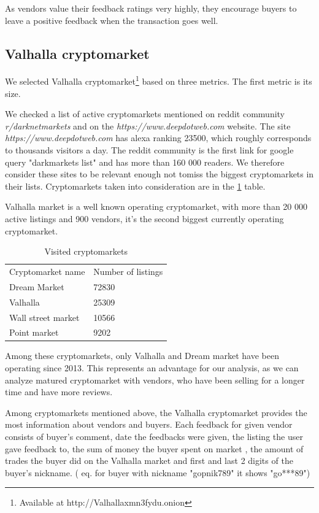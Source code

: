 \documentclass[
  digital, %
  table,   %
  lof,     %
  lot,     %
  oneside
]{fithesis3}
\begin{document}
As vendors value their feedback ratings very highly, they encourage buyers to leave a positive feedback when the transaction goes well.
 
\subsection{Valhalla cryptomarket}

We selected Valhalla cryptomarket\footnote{Available at http://Valhallaxmn3fydu.onion} based on three metrics.
The first metric is its size.

We checked a list of active cryptomarkets mentioned on reddit community \emph{r/darknetmarkets} and on the 
\emph{https://www.deepdotweb.com} website.
The site \emph{https://www.deepdotweb.com} has alexa ranking 23500, which roughly corresponds to thousands visitors a day.
The reddit community is the first link for google query "darkmarkets list" and 
has more than 160 000 readers. We therefore consider these sites to be relevant enough not tomiss
the biggest cryptomarkets in their lists. Cryptomarkets taken into consideration are in the \ref{cryptomarkets} table.

Valhalla market is a well known operating cryptomarket, with more than 20 000 active listings and 900 vendors, it's the second biggest currently operating cryptomarket.

\begin{table}
    \caption{Visited cryptomarkets}
    \label{cryptomarkets}
    \begin{tabular}{|l|l|}
    Cryptomarket name & Number of listings\\
    Dream Market & 72830 \\
    Valhalla     & 25309 \\
    Wall street market   & 10566 \\
    Point market  & 9202 \\
    \end{tabular}
\end{table}

Among these cryptomarkets, only Valhalla and Dream market have been operating since 2013.
This represents an advantage for our analysis, as we can analyze matured cryptomarket with vendors,
who have been selling for a longer time and have more reviews.

Among cryptomarkets mentioned above,
the Valhalla cryptomarket provides the most information about vendors and buyers.
Each feedback for given vendor consists of 
buyer's comment, date the feedbacks were given, the listing the user gave feedback to, the sum of money the buyer spent on market
, the amount of trades the buyer did on the Valhalla market and
first and last 2 digits of the buyer's nickname. 
( eq. for buyer with nickname "gopnik789" it shows "go***89")
\end{document}
